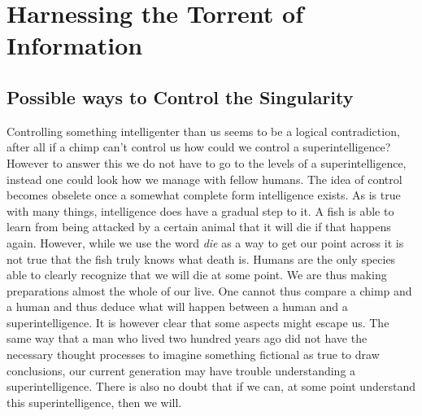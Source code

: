 \documentclass[
      12pt,
      a4paper,
      cleardoublepage=empty,
      final,
      twoside
        ]{scrbook}
\begin{document}
  \section{Harnessing the Torrent of Information}
    \subsection{Possible ways to Control the Singularity}
      \begin{par}
        Controlling something intelligenter than us seems to be a logical contradiction, after all if a chimp can't control us how could we control a superintelligence?
        However to answer this we do not have to go to the levels of a superintelligence, instead one could look how we manage with fellow humans.
        The idea of control becomes obselete once a somewhat complete form intelligence exists.
        As is true with many things, intelligence does have a gradual step to it.
        A fish is able to learn from being attacked by a certain animal that it will die if that happens again.
        However, while we use the word \emph{die} as a way to get our point across it is not true that the fish truly knows what death is.
        Humans are the only species able to clearly recognize that we will die at some point.
        We are thus making preparations almost the whole of our live.
        One cannot thus compare a chimp and a human and thus deduce what will happen between a human and a superintelligence.
        It is however clear that some aspects might escape us.
        The same way that a man who lived two hundred years ago did not have the necessary thought processes to imagine something fictional as true to draw conclusions, our current generation may have trouble understanding a superintelligence.
        There is also no doubt that if we can, at some point understand this superintelligence, then we will.\cite{FutureMinds}
      \end{par}



\cleardoubleemptypage

\backmatter

{}


\end{document}
